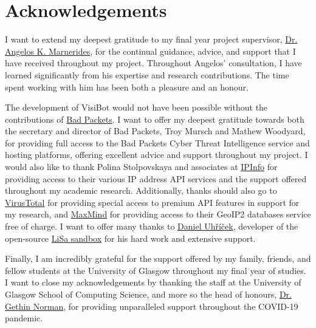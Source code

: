 \chapter*{Acknowledgements}

I want to extend my deepest gratitude to my final year project supervisor, \hyperlink{https://www.gla.ac.uk/schools/computing/staff/angelosmarnerides/}{Dr. Angelos K. Marnerides}, for the continual guidance, advice, and support that I have received throughout my project. Throughout Angelos' consultation, I have learned significantly from his expertise and research contributions. The time spent working with him has been both a pleasure and an honour.

The development of VisiBot would not have been possible without the contributions of \hyperlink{https://badpackets.net/}{Bad Packets}. I want to offer my deepest gratitude towards both the secretary and director of Bad Packets, Troy Mursch and Mathew Woodyard, for providing full access to the Bad Packets Cyber Threat Intelligence service and hosting platforms, offering excellent advice and support throughout my project. I would also like to thank Polina Stolpovskaya and associates at \hyperlink{https://ipinfo.io/}{IPInfo} for providing access to their various IP address API services and the support offered throughout my academic research. Additionally, thanks should also go to \hyperlink{https://www.virustotal.com/gui/}{VirusTotal} for providing special access to premium API features in support for my research, and \hyperlink{https://www.maxmind.com}{MaxMind} for providing access to their GeoIP2 databases service free of charge. I want to offer many thanks to \hyperlink{https://github.com/danieluhricek}{Daniel Uhříček}, developer of the open-source \hyperlink{https://github.com/danieluhricek/LiSa}{LiSa sandbox} for his hard work and extensive support. 

Finally, I am incredibly grateful for the support offered by my family, friends, and fellow students at the University of Glasgow throughout my final year of studies. I want to close my acknowledgements by thanking the staff at the University of Glasgow School of Computing Science, and more so the head of honours,  \hyperlink{https://www.gla.ac.uk/schools/computing/staff/gethinnorman/}{Dr. Gethin Norman}, for providing unparalleled support throughout the COVID-19 pandemic. 